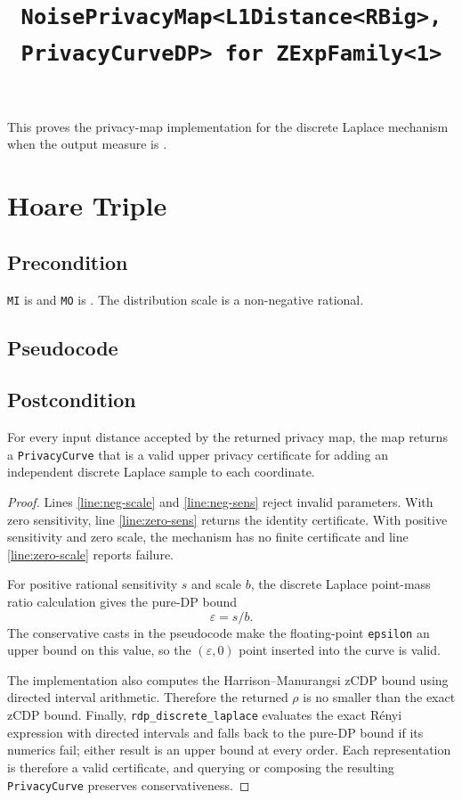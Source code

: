 \documentclass{article}
\title{\texttt{NoisePrivacyMap<L1Distance<RBig>, PrivacyCurveDP> for ZExpFamily<1>}}
\author{\MichaelShoemateAuthor}
\date{}
\begin{document}
\maketitle

\contrib
This proves the privacy-map implementation for the discrete Laplace mechanism
when the output measure is .

\section{Hoare Triple}
\subsection*{Precondition}
\texttt{MI} is  and \texttt{MO} is
. The distribution scale is a
non-negative rational.

\subsection*{Pseudocode}


\subsection*{Postcondition}
\begin{theorem}
For every input distance accepted by the returned privacy map, the map returns
a \texttt{PrivacyCurve} that is a valid upper privacy certificate for adding an
independent discrete Laplace sample to each coordinate.
\end{theorem}

\begin{proof}
Lines \ref{line:neg-scale} and \ref{line:neg-sens} reject invalid
parameters. With zero sensitivity, line \ref{line:zero-sens} returns the
identity certificate. With positive sensitivity and zero scale, the mechanism
has no finite certificate and line \ref{line:zero-scale} reports failure.

For positive rational sensitivity $s$ and scale $b$, the discrete Laplace
point-mass ratio calculation gives the pure-DP bound
\[
    \varepsilon = s/b.
\]
The conservative casts in the pseudocode make the floating-point
\texttt{epsilon} an upper bound on this value, so the $(\varepsilon,0)$ point
inserted into the curve is valid.

The implementation also computes the Harrison--Manurangsi zCDP bound using
directed interval arithmetic. Therefore the returned $\rho$ is no smaller
than the exact zCDP bound. Finally, \texttt{rdp\_discrete\_laplace} evaluates
the exact Rényi expression with directed intervals and falls back to the
pure-DP bound if its numerics fail; either result is an upper bound at every
order. Each representation is therefore a valid certificate, and querying or
composing the resulting \texttt{PrivacyCurve} preserves conservativeness.
\end{proof}
\end{document}
